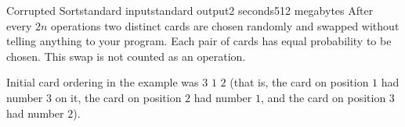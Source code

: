 \begin{problem}{Corrupted Sort}{standard input}{standard output}{2 seconds}{512 megabytes}
After every $2n$ operations two distinct cards are chosen randomly and swapped without telling anything to your program. Each pair of cards has equal probability to be chosen. This swap is not counted as an operation.

\Example

\begin{example}
%
\end{example}

\Note
Initial card ordering in the example was $3$ $1$ $2$ (that is, the card on position $1$ had number $3$ on it, the card on position $2$ had number $1$, and the card on position $3$ had number $2$).

\end{problem}

